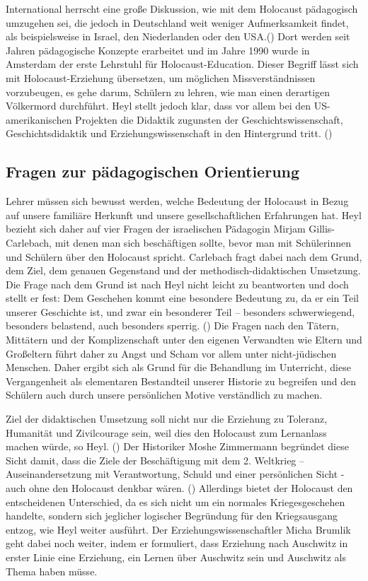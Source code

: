 International herrscht eine große Diskussion, wie mit dem Holocaust pädagogisch umzugehen sei, die jedoch in Deutschland weit weniger Aufmerksamkeit findet, als beispielsweise in Israel, den Niederlanden oder den USA.(\cite[S.\,64]{IA96}) Dort werden seit Jahren pädagogische Konzepte erarbeitet und im Jahre 1990 wurde in Amsterdam der erste Lehrstuhl für \glqq Holocaust-Education\grqq{}.
Dieser Begriff lässt sich mit \glqq Holocaust-Erziehung\grqq{} übersetzen, um möglichen Missverständnissen vorzubeugen, es gehe darum, Schülern zu lehren, wie man einen derartigen Völkermord durchführt.
Heyl stellt jedoch klar, dass vor allem bei den US-amerikanischen Projekten die Didaktik zugunsten der Geschichtswissenschaft, Geschichtsdidaktik und Erziehungswissenschaft in den Hintergrund tritt.
(\cite[S.\,64]{IA96})

\subsection{Fragen zur pädagogischen Orientierung}
Lehrer müssen sich bewusst werden, welche Bedeutung der Holocaust in Bezug auf unsere familiäre Herkunft und unsere gesellschaftlichen Erfahrungen hat.
Heyl bezieht sich daher auf vier Fragen der israelischen Pädagogin Mirjam Gillis-Carlebach, mit denen man sich beschäftigen sollte, bevor man mit Schülerinnen und Schülern über den Holocaust spricht.
Carlebach fragt dabei nach dem Grund, dem Ziel, dem genauen Gegenstand und der methodisch-didaktischen Umsetzung.
Die Frage nach dem Grund ist nach Heyl nicht leicht zu beantworten und doch stellt er fest: \glqq Dem Geschehen kommt eine besondere Bedeutung zu, da er ein Teil unserer Geschichte ist, und zwar ein besonderer Teil – besonders schwerwiegend, besonders belastend, auch besonders sperrig.\grqq{} (\cite[S.\,68]{IA96}) Die Fragen nach den Tätern, Mittätern und der Komplizenschaft unter den eigenen Verwandten wie Eltern und Großeltern führt daher zu Angst und Scham vor allem unter nicht-jüdischen Menschen.
Daher ergibt sich als Grund für die Behandlung im Unterricht, diese Vergangenheit als elementaren Bestandteil unserer Historie zu begreifen und den Schülern auch durch unsere persönlichen Motive verständlich zu machen.

Ziel der didaktischen Umsetzung soll nicht nur die Erziehung zu Toleranz, Humanität und Zivilcourage sein, weil dies den Holocaust zum Lernanlass machen würde, so Heyl. (\cite[S.\,68]{IA96})
Der Historiker Moshe Zimmermann begründet diese Sicht damit, dass die Ziele der Beschäftigung mit dem 2. Weltkrieg – Auseinandersetzung mit Verantwortung, Schuld und einer persönlichen Sicht - auch ohne den Holocaust denkbar wären. (\cite[S.\,69]{IA96})
Allerdings bietet der Holocaust den entscheidenen Unterschied, da es sich nicht um ein \glqq normales\grqq{} Kriegesgeschehen handelte, sondern sich jeglicher logischer Begründung für den Kriegsausgang entzog, wie Heyl weiter ausführt.
Der Erziehungswissenschaftler Micha Brumlik geht dabei noch weiter, indem er formuliert, dass \glqq Erziehung nach Auschwitz\grqq{} in erster Linie eine Erziehung, ein Lernen über Auschwitz sein und Auschwitz als Thema haben müsse.


